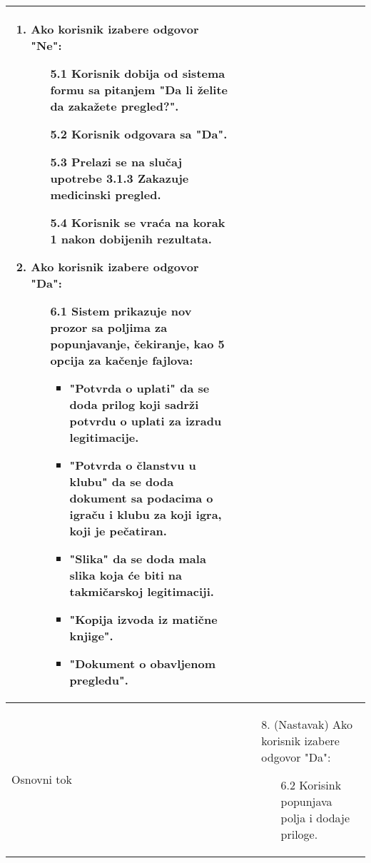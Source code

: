 \documentclass{article}
\begin{document}
\begin{longtable}{| p{} | p{} |}
\begin{enumerate}
                    \item Ako korisnik izabere odgovor "Ne":
                    \begin{enumerate}
                        \item[5.1] Korisnik dobija od sistema formu sa pitanjem "Da li želite da zakažete pregled?".
                        \item[5.2] Korisnik odgovara sa "Da".
                        \item[5.3] Prelazi se na slučaj upotrebe 3.1.3 Zakazuje medicinski pregled.
                        \item[5.4] Korisnik se vraća na korak 1 nakon dobijenih rezultata.
                    \end{enumerate}
                    \item Ako korisnik izabere odgovor "Da":
                    \begin{enumerate}
                        \item[6.1] Sistem prikazuje nov prozor sa poljima za popunjavanje, čekiranje, kao 5 opcija za kačenje fajlova:
                        \begin{itemize}
                            \item "Potvrda o uplati" da se doda prilog koji sadrži potvrdu o uplati za izradu legitimacije.
                            \item "Potvrda o članstvu u klubu" da se doda dokument sa podacima o igraču i klubu za koji igra, koji je pečatiran.
                            \item "Slika" da se doda mala slika koja će biti na takmičarskoj legitimaciji.
                            \item "Kopija izvoda iz matične knjige".
                            \item "Dokument o obavljenom pregledu".
                        \end{itemize}  
                    \end{enumerate}
                 \end{enumerate}\\
            \hline
                Osnovni tok &
                \begin{enumerate}
                    \item[8.] (Nastavak)  Ako korisnik izabere odgovor "Da":
                    \begin{enumerate}
                        \item[6.2] Korisink popunjava polja i dodaje priloge.

\end{enumerate}
\end{enumerate}
\end{longtable}
\end{document}
